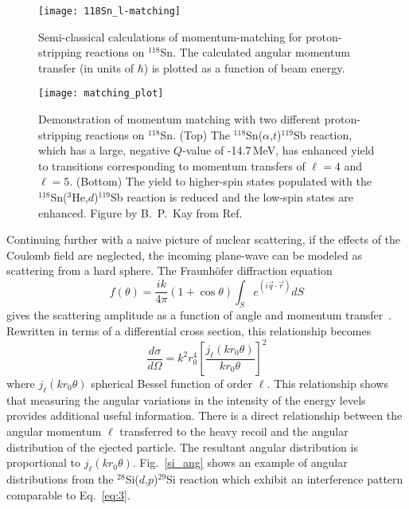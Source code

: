 \begin{figure}%
\centering
\texttt{[image: 118Sn\_l-matching]}%
\caption[Semi-classical calculations of momentum-matching for proton-stripping reactions on $^{118}$Sn]{Semi-classical calculations of momentum-matching for proton-stripping reactions on $^{118}$Sn.  The calculated angular momentum transfer (in units of $\hbar$) is plotted as a function of beam energy.}%
\label{l_matching}%
\end{figure}

\begin{figure}%
\centering
\texttt{[image: matching\_plot]}%
\caption[Demonstration of momentum matching with two proton-stripping reaction on $^{118}$Sn]{Demonstration of momentum matching with two different proton-stripping reactions on $^{118}$Sn.  (Top) The $^{118}$Sn($\alpha$,$t$)$^{119}$Sb reaction, which has a large, negative $Q$-value of -14.7\,MeV, has enhanced yield to transitions corresponding to momentum transfers of $\ell=4$ and $\ell=5$. (Bottom) The yield to higher-spin states populated with the $^{118}$Sn($^3$He,$d$)$^{119}$Sb reaction is reduced and the low-spin states are enhanced.  Figure by B.~P.\ Kay from Ref.~\cite{Kay_2010PC}}%
\label{l_matching_spectra}%
\end{figure}

Continuing further with a naive picture of nuclear scattering, if the effects of the Coulomb field are neglected, the incoming plane-wave can be modeled as scattering from a hard sphere.  The Fraunh\"ofer diffraction equation
\begin{equation}
f(\theta)=\frac{ik}{4\pi}(1+\cos \theta)\int_S{e^{(i\vec{q}\cdot \vec{r})}dS}
\label{eq:1}
\end{equation}
gives the scattering amplitude as a function of angle and momentum transfer~\cite{Satchler_1990}.  Rewritten in terms of a differential cross section, this relationship becomes
\begin{equation}
\frac{d \sigma}{d \Omega}=k^2 r_0^4 \left[\frac{j_\ell(kr_0\theta)}{kr_0\theta}\right]^2
\label{eq:3}
\end{equation}
where $j_\ell(kr_0\theta)$ spherical Bessel function of order $\ell$.  
This relationship shows that measuring the angular variations in the intensity of the energy levels provides additional useful information.  There is a direct relationship between the angular momentum $\ell$ transferred to the heavy recoil and the angular distribution of the ejected particle.  The resultant angular distribution is proportional to $j_\ell(kr_0\theta)$. Fig.~\ref{si_ang} shows an example of angular distributions from the $^{28}$Si($d$,$p$)$^{29}$Si reaction which exhibit an interference pattern comparable to Eq.~\ref{eq:3}.

